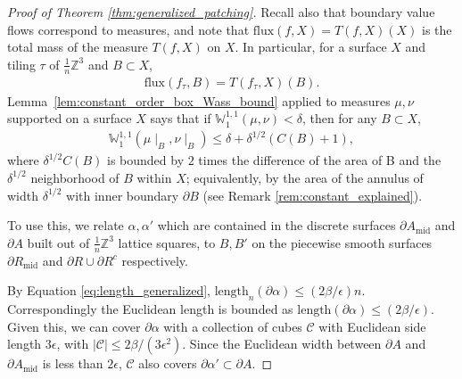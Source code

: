 \documentclass[11pt]{article}
\theoremstyle{remark}
\theoremstyle{definition}
\newcommand{\mc}[1]{\mathcal{#1}}
\newcommand{\m}[1]{\mathbb{#1}}
\begin{document}
\begin{proof}[Proof of Theorem \ref{thm:generalized_patching}]
    Recall also that boundary value flows correspond to measures, and note that $\text{flux}(f,X) = T(f,X)(X)$ is the total mass of the measure $T(f,X)$ on $X$. In particular, for a surface $X$ and tiling $\tau$ of $\frac{1}{n}\m Z^3$ and $B\subset X$,
    \begin{align*}
        \text{flux}(f_\tau, B) = T(f_\tau,X)(B).
    \end{align*}
Lemma~\ref{lem:constant_order_box_Wass_bound} applied to measures $\mu,\nu$ supported on a surface $X$ says that if $\m W_1^{1,1}(\mu,\nu)<\delta$, then for any $B\subset X$,  
    \begin{align*}
        \m W_1^{1,1}(\mu\mid_B,\nu\mid_B) \leq \delta + \delta^{1/2} (C(B)+1),
    \end{align*}
    where $\delta^{1/2} C(B)$ is bounded by $2$ times the difference of the area of B and the $\delta^{1/2}$ neighborhood of $B$ within $X$; equivalently, by the area of the annulus of width $\delta^{1/2}$ with inner boundary $\partial B$ (see Remark \ref{rem:constant_explained}). 
    
To use this, we relate $\alpha,\alpha'$ which are contained in the discrete surfaces $\partial A_{\text{mid}}$ and $\partial A$ built out of $\frac{1}{n}\m Z^3$ lattice squares, to $B,B'$ on the piecewise smooth surfaces $\partial R_{\text{mid}}$ and $\partial R\cup\partial R^c$ respectively.

By Equation \eqref{eq:length_generalized}, $\text{length}_n(\partial \alpha) \leq (2\beta/\epsilon)n$. Correspondingly the Euclidean length is bounded as $\text{length}(\partial \alpha)\leq (2\beta/\epsilon)$. Given this, we can cover $\partial \alpha$ with a collection of cubes $\mc C$ with Euclidean side length $3\epsilon$, with $|\mc C|\leq 2\beta/(3\epsilon^2)$. Since the Euclidean width between $\partial A$ and $\partial A_{\text{mid}}$ is less than $2\epsilon$, $\mc C$ also covers $\partial \alpha'\subset \partial A$.


\end{proof}
\end{document}
